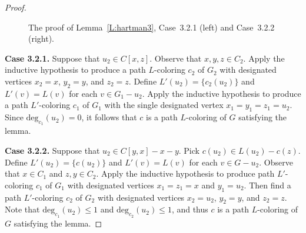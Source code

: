\documentclass[12pt,letterpaper]{article}
\theoremstyle{plain}
\theoremstyle{definition}
\theoremstyle{break}
\begin{document}
\begin{proof}
\begin{figure}[ht]
\begin{center}
\caption{The proof of Lemma~\ref{L:hartman3}, Case~3.2.1 (left) and
Case~3.2.2 (right).}
\end{center}
\end{figure}

\textbf{Case 3.2.1.}
Suppose that $u_2\in C[x,z]$. Observe that $x,y,z\in C_2$.
Apply the inductive hypothesis to produce a path $L$-coloring
$c_2$ of $G_2$ with designated
vertices $x_2=x$, $y_2=y$, and $z_2=z$.
Define $L'(u_2)=\{c_2(u_2)\}$ and $L'(v)=L(v)$ for each
$v\in G_1-u_2$. Apply the inductive hypothesis to produce a path $L'$-coloring
$c_1$ of $G_1$ with the single designated vertex $x_1=y_1=z_1=u_2$. Since 
$\text{deg}_{c_1}(u_2)=0$, it follows that $c$ is a path $L$-coloring of $G$
satisfying the lemma.

\textbf{Case 3.2.2.}
Suppose that $u_2\in C[y,x]-x-y$. Pick $c(u_2)\in L(u_2)-c(z)$. Define
$L'(u_2)=\{c(u_2)\}$ and $L'(v)=L(v)$ for each $v\in G-u_2$. 
Observe that
$x\in C_1$ and $z,y\in C_2$. Apply the inductive hypothesis to produce path
$L'$-coloring $c_1$ of
$G_1$ with designated vertices $x_1=z_1=x$ and $y_1=u_2$.
Then find a path
$L'$-coloring $c_2$ of $G_2$ with designated vertices $x_2=u_2$, $y_2=y$, and
$z_2=z$. Note that $\text{deg}_{c_1}(u_2)\le 1$ and
$\text{deg}_{c_2}(u_2)\le 1$, and thus $c$ is a path $L$-coloring of $G$
satisfying the lemma.


\end{proof}
\end{document}
